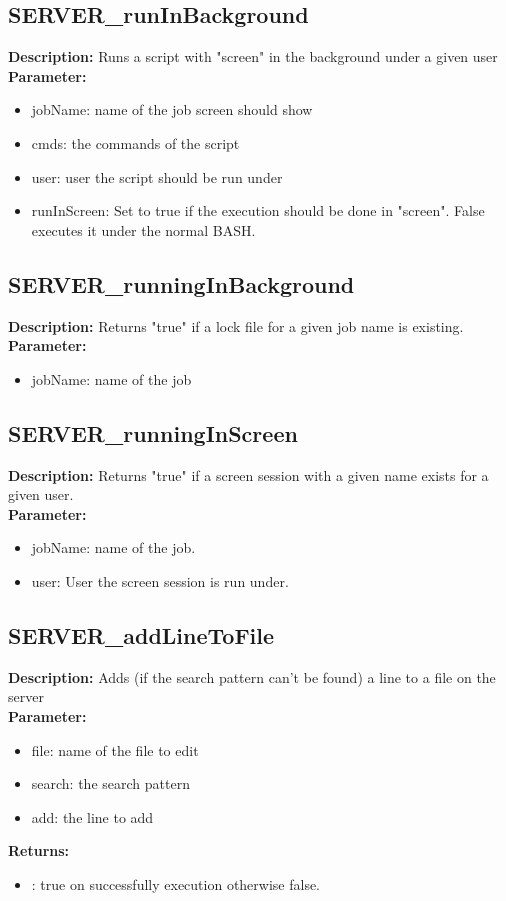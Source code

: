 \subsection{SERVER\_runInBackground}
\textbf{Description:} Runs a script with "screen" in the background under a given user\\
\textbf{Parameter:}
\begin{itemize}
\item jobName: name of the job screen should show
\item cmds: the commands of the script 
\item user: user the script should be run under
\item runInScreen: Set to true if the execution should be done in "screen". False executes it under the normal BASH.
\end{itemize}

\subsection{SERVER\_runningInBackground}
\textbf{Description:} Returns "true" if a lock file for a given job name is existing.\\
\textbf{Parameter:}
\begin{itemize}
\item jobName: name of the job
\end{itemize}

\subsection{SERVER\_runningInScreen}
\textbf{Description:} Returns "true" if a screen session with a given name exists for a given user.\\
\textbf{Parameter:}
\begin{itemize}
\item jobName: name of the job.
\item user: User the screen session is run under.
\end{itemize}

\subsection{SERVER\_addLineToFile}
\textbf{Description:} Adds (if the search pattern can't be found) a line to a file on the server\\
\textbf{Parameter:}
\begin{itemize}
\item file: name of the file to edit
\item search: the search pattern
\item add: the line to add
\end{itemize}
\textbf{Returns:}
\begin{itemize}
\item : true on successfully execution otherwise false.
\end{itemize}

